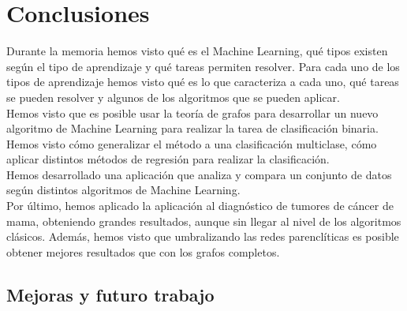 \chapter{Conclusiones}\label{cap:conclusiones}

Durante la memoria hemos visto qué es el Machine Learning, qué tipos existen según el tipo de aprendizaje y qué tareas permiten resolver. Para cada uno de los tipos de aprendizaje hemos visto qué es lo que caracteriza a cada uno, qué tareas se pueden resolver y algunos de los algoritmos que se pueden aplicar.\\

Hemos visto que es posible usar la teoría de grafos para desarrollar un nuevo algoritmo de Machine Learning para realizar la tarea de clasificación binaria. Hemos visto cómo generalizar el método a una clasificación multiclase, cómo aplicar distintos métodos de regresión para realizar la clasificación.\\

Hemos desarrollado una aplicación que analiza y compara un conjunto de datos según distintos algoritmos de Machine Learning.\\

Por último, hemos aplicado la aplicación al diagnóstico de tumores de cáncer de mama, obteniendo grandes resultados, aunque sin llegar al nivel de los algoritmos clásicos. Además, hemos visto que umbralizando las redes parenclíticas es posible obtener mejores resultados que con los grafos completos.
   
\section{Mejoras y futuro trabajo}

